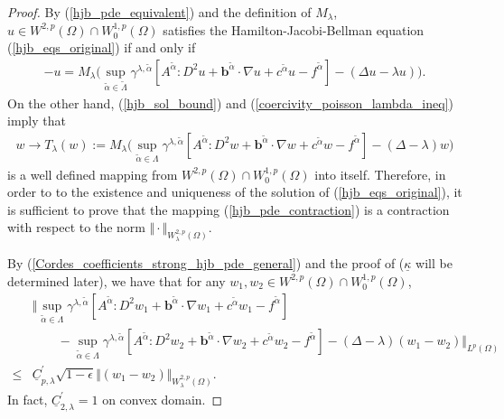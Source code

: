 \documentclass[12pt]{amsart}
\theoremstyle{definition}
\theoremstyle{remark}
\begin{document}
\begin{proof}
By (\ref{hjb_pde_equivalent}) and the definition of $M_{\lambda}$, $u 
\in W^{2,p}(\Omega)\cap W_{0}^{1,p}(\Omega)$ satisfies the 
Hamilton-Jacobi-Bellman equation (\ref{hjb_eqs_original}) if and only if
\begin{align*}
- u = M_{\lambda}\big( \sup_{\tilde{\alpha} \in \tilde{\Lambda}} 
\gamma^{\lambda,\tilde{\alpha}}[A^{\tilde{\alpha}}:D^{2}u 
+ \boldsymbol{b}^{\tilde{\alpha}}\cdot \nabla u 
+ c^{\tilde{\alpha}}u - f^{\tilde{\alpha}}] 
- (\Delta u - \lambda u)\big).
\end{align*} 
On the other hand, (\ref{hjb_sol_bound}) and 
(\ref{coercivity_poisson_lambda_ineq}) imply that
\begin{align}
\label{hjb_pde_contraction}
w \rightarrow T_{\lambda}(w):= 
M_{\lambda}\big( \sup_{\tilde{\alpha} \in 
\Lambda} \gamma^{\lambda,\tilde{\alpha}} [A^{\tilde{\alpha}}:D^{2}w 
+ \boldsymbol{b}^{\tilde{\alpha}}\cdot \nabla w 
+ c^{\tilde{\alpha}}w - f^{\tilde{\alpha}}] - (\Delta - \lambda)w \big)
\end{align}
is a well defined mapping from $W^{2,p}(\Omega)\cap W_{0}^{1,p}(\Omega)$ into 
itself. 
Therefore, in order to to the existence and uniqueness of the solution 
of (\ref{hjb_eqs_original}), it is sufficient to prove that 
the mapping (\ref{hjb_pde_contraction}) is a contraction with respect to 
the norm $\Vert \cdot\Vert_{W_{\lambda}^{2,p}(\Omega)}$.

By (\ref{Cordes_coefficients_strong_hjb_pde_general}) and the proof 
of \cite[Lemma~$1$]{SmearsSuli2014} ($\underline{\kappa}$ 
will be determined later), we have that 
for any $w_{1},w_{2}\in W^{2,p}(\Omega)\cap W_{0}^{1,p}(\Omega)$,
\begin{align}
\label{hjb_operator_diff_ineq}
& \Vert \sup_{\tilde{\alpha} \in 
\Lambda} \gamma^{\lambda,\tilde{\alpha}} [A^{\tilde{\alpha}}:D^{2}w_{1} 
+ \boldsymbol{b}^{\tilde{\alpha}}\cdot \nabla w_{1} 
+ c^{\tilde{\alpha}}w_{1} - f^{\tilde{\alpha}}] \\
\nonumber
& \qquad - \sup_{\tilde{\alpha} \in 
\Lambda} \gamma^{\lambda,\tilde{\alpha}} [A^{\tilde{\alpha}}:D^{2}w_{2} 
+ \boldsymbol{b}^{\tilde{\alpha}}\cdot \nabla w_{2} 
+ c^{\tilde{\alpha}}w_{2} - f^{\tilde{\alpha}}] 
- (\Delta - \lambda)(w_{1} - w_{2})\Vert_{L^{p}(\Omega)} \\
\nonumber
\leq & \underline{C}_{p,\lambda}^{\prime}\sqrt{1 - \epsilon}\Vert 
(w_{1}-w_{2})\Vert_{W_{\lambda}^{2,p}(\Omega)}.
\end{align}
In fact, $\underline{C}_{2,\lambda}^{\prime} = 1$ on convex domain.


\end{proof}
\end{document}
